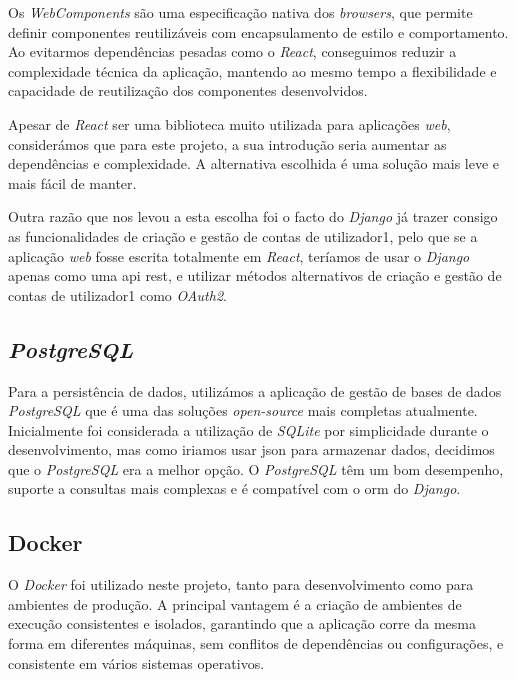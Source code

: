 Os \textit{WebComponents} \cite{webcomponents} são uma especificação nativa dos \textit{browsers}, que permite definir componentes reutilizáveis com encapsulamento de estilo e comportamento. Ao evitarmos dependências pesadas como o \textit{React}, conseguimos reduzir a complexidade técnica da aplicação, mantendo ao mesmo tempo a flexibilidade e capacidade de reutilização dos componentes desenvolvidos.

Apesar de \textit{React} ser uma biblioteca muito utilizada para aplicações \textit{web}, considerámos que para este projeto, a sua introdução seria aumentar as dependências e complexidade. A alternativa escolhida é uma solução mais leve e mais fácil de manter. 

Outra razão que nos levou a esta escolha foi o facto do \textit{Django} já trazer consigo as funcionalidades de criação e gestão de contas de utilizador1, pelo que se a aplicação \textit{web} fosse escrita totalmente em \textit{React}, teríamos de usar o \textit{Django} apenas como uma \gls{api} \gls{rest}, e utilizar métodos alternativos de criação e gestão de contas de utilizador1 como \textit{OAuth2}.

\subsection{\textit{PostgreSQL}}

Para a persistência de dados, utilizámos a aplicação de gestão de bases de dados \textit{PostgreSQL} que é uma das soluções \textit{open-source} mais completas atualmente. Inicialmente foi considerada a utilização de \textit{SQLite} por simplicidade durante o desenvolvimento, mas como iriamos usar \gls{json} para armazenar dados,  decidimos que o \textit{PostgreSQL} era a melhor opção. O \textit{PostgreSQL} têm um bom desempenho, suporte a consultas mais complexas e é compatível com o \gls{orm} do \textit{Django}.

\subsection{Docker}

O \textit{Docker} foi utilizado neste projeto, tanto para desenvolvimento como para ambientes de produção. A principal vantagem é a criação de ambientes de execução consistentes e isolados, garantindo que a aplicação corre da mesma forma em diferentes máquinas, sem conflitos de dependências ou configurações, e consistente em vários sistemas operativos. 

